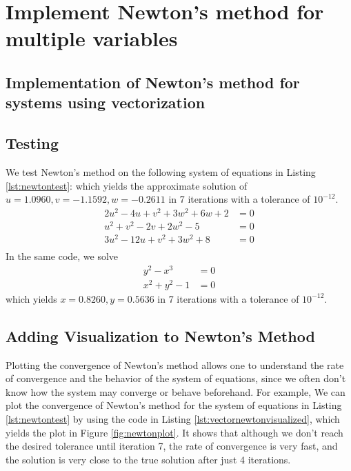 \documentclass[11pt]{article}
\begin{document}
\section{Implement Newton's method for multiple variables}


\subsection{Implementation of Newton's method for systems using vectorization}



\subsection{Testing}

We test Newton's method on the following system of equations in Listing \ref{lst:newtontest}: which yields the approximate solution of $u = 1.0960, v = -1.1592, w = -0.2611$ in 7 iterations with a tolerance of $10^{-12}$.
\begin{equation}
\begin{aligned}
  2u^2 - 4u + v^2 + 3w^2 + 6w + 2 &= 0 \\
  u^2 + v^2 - 2v + 2w^2 - 5 &= 0 \\
  3u^2 - 12u + v^2 + 3w^2 + 8 &= 0 \\
\end{aligned}
\end{equation}
In the same code, we solve
\begin{equation}
\begin{aligned}
  y^2 - x^3 &= 0 \\
  x^2 + y^2 - 1 &= 0 
\end{aligned}
\end{equation}
which yields $x = 0.8260, y = 0.5636$ in 7 iterations with a tolerance of $10^{-12}$.


\subsection{Adding Visualization to Newton's Method}

Plotting the convergence of Newton's method allows one to understand the rate of convergence and the behavior of the system of equations, since we often don't know how the system may converge or behave beforehand. For example, We can plot the convergence of Newton's method for the system of equations in Listing \ref{lst:newtontest} by using the code in Listing \ref{lst:vectornewtonvisualized}, which yields the plot in Figure \ref{fig:newtonplot}. It shows that although we don't reach the desired tolerance until iteration 7, the rate of convergence is very fast, and the solution is very close to the true solution after just 4 iterations.
\end{document}
